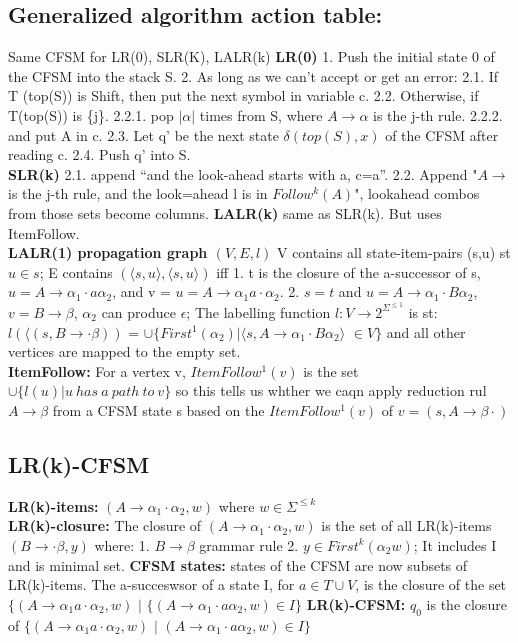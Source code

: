 \subsection*{Generalized algorithm action table:}
Same CFSM for LR(0), SLR(K), LALR(k)
\textbf{LR(0)} 1. Push the initial state 0 of the CFSM into the stack S. 2. As long as we can’t accept or get an error: 2.1. If T (top(S)) is Shift, then put the next symbol in variable c. 2.2. Otherwise, if T(top(S)) is \{j\}. 2.2.1. pop $|\alpha|$ times from S, where $A \rightarrow \alpha$ is the j-th rule. 2.2.2. and put A in c. 2.3. Let q' be the next state $\delta (top(S),x)$ of the CFSM after reading c. 2.4. Push  q' into S.\\
\textbf{SLR(k)} 2.1. append ``and the look-ahead starts with a, c=a''. 2.2. Append "$A \rightarrow$ is the j-th rule, and the look=ahead l is in $Follow^k(A)$", lookahead combos from those sets become columns.
\textbf{LALR(k)} same as SLR(k). But uses ItemFollow.\\
\textbf{LALR(1) propagation graph $(V,E,l)$} V contains all state-item-pairs (s,u) st $u \in s$; E contains $(\langle s,u\rangle, \langle s,u\rangle)$ iff 1. t is the closure of the a-successor of s, $u = A \rightarrow \alpha_1 \cdotp a \alpha_2$, and v = $u = A \rightarrow \alpha_1 a \cdotp \alpha_2$. 2. $s = t$ and $u = A \rightarrow \alpha_1 \cdotp B \alpha_2$, $v = B \rightarrow \beta$, $\alpha_2$ can produce $\epsilon$; The labelling function $l: V \rightarrow 2^{\Sigma^{\leqslant 1}}$ is st: $l(\langle(s,B\rightarrow \cdotp \beta))$ = $\cup \{First^1(\alpha_2)$$| \langle s,A \rightarrow \alpha_1 \cdotp B \alpha_2\rangle$ $\in V\}$ and all other vertices are mapped to the empty set.\\
\textbf{ItemFollow:} For a vertex v, $ItemFollow^1(v)$ is the set $\cup\{ l(u) | u\ has\ a\ path\ to\ v\}$ so this tells us whther we caqn apply reduction rul $A \rightarrow \beta$ from a CFSM state s based on the $ItemFollow^1(v)$ of $v = (s,A\rightarrow \beta \cdotp)$
\subsection*{LR(k)-CFSM}
\textbf{LR(k)-items:} $(A\rightarrow \alpha_1 \cdotp \alpha_2,w)$ where $w\in \Sigma^{\leqslant k}$\\
\textbf{LR(k)-closure:} The closure of $(A\rightarrow \alpha_1 \cdotp \alpha_2,w)$ is the set of all LR(k)-items $(B \rightarrow \cdotp \beta,y)$ where: 1. $B \rightarrow \beta$ grammar rule 2. $y \in First^k(\alpha_2 w)$; It includes I and is minimal set.
\textbf{CFSM states:} states of the CFSM are now subsets of LR(k)-items. The a-succeswsor of a state I, for $a \in T\cup V$, is the closure of the set $\{(A\rightarrow \alpha_1 a \cdotp \alpha_2,w)$ $|$ $\{(A\rightarrow \alpha_1 \cdotp a \alpha_2,w) \in I\}$
\textbf{LR(k)-CFSM:} $q_0$ is the closure of $\{(A\rightarrow \alpha_1 a \cdotp \alpha_2,w)$ $|$ $(A\rightarrow \alpha_1 \cdotp a \alpha_2,w) \in I\}$
